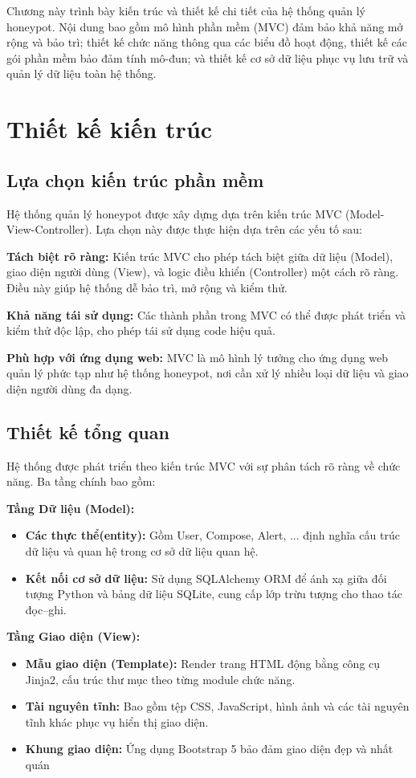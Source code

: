 \documentclass[../DoAn.tex]{subfiles}
\begin{document}
Chương này trình bày kiến trúc và thiết kế chi tiết của hệ thống quản lý honeypot. Nội dung bao gồm mô hình phần mềm (MVC) đảm bảo khả năng mở rộng và bảo trì; thiết kế chức năng thông qua các biểu đồ hoạt động, thiết kế các gói phần mềm bảo đảm tính mô-đun; và thiết kế cơ sở dữ liệu phục vụ lưu trữ và quản lý dữ liệu toàn hệ thống.

\section{Thiết kế kiến trúc}
\subsection{Lựa chọn kiến trúc phần mềm}
Hệ thống quản lý honeypot được xây dựng dựa trên kiến trúc MVC (Model-View-Controller). Lựa chọn này được thực hiện dựa trên các yếu tố sau:

\textbf{Tách biệt rõ ràng:} Kiến trúc MVC cho phép tách biệt giữa dữ liệu (Model), giao diện người dùng (View), và logic điều khiển (Controller) một cách rõ ràng. Điều này giúp hệ thống dễ bảo trì, mở rộng và kiểm thử.

\textbf{Khả năng tái sử dụng:} Các thành phần trong MVC có thể được phát triển và kiểm thử độc lập, cho phép tái sử dụng code hiệu quả.

\textbf{Phù hợp với ứng dụng web:} MVC là mô hình lý tưởng cho ứng dụng web quản lý phức tạp như hệ thống honeypot, nơi cần xử lý nhiều loại dữ liệu và giao diện người dùng đa dạng.


\subsection{Thiết kế tổng quan}
Hệ thống được phát triển theo kiến trúc MVC với sự phân tách rõ ràng về chức năng. Ba tầng chính bao gồm:

\textbf{Tầng Dữ liệu (Model):}
\begin{itemize}
    \item \textbf{Các thực thể(entity):} Gồm User, Compose, Alert, ... định nghĩa cấu trúc dữ liệu và quan hệ trong cơ sở dữ liệu quan hệ.
    \item \textbf{Kết nối cơ sở dữ liệu:} Sử dụng SQLAlchemy ORM để ánh xạ giữa đối tượng Python và bảng dữ liệu SQLite, cung cấp lớp trừu tượng cho thao tác đọc–ghi.
\end{itemize}

\textbf{Tầng Giao diện (View):}
\begin{itemize}
    \item \textbf{Mẫu giao diện (Template):} Render trang HTML động bằng công cụ Jinja2, cấu trúc thư mục theo từng module chức năng.
    \item \textbf{Tài nguyên tĩnh:} Bao gồm tệp CSS, JavaScript, hình ảnh và các tài nguyên tĩnh khác phục vụ hiển thị giao diện.
    \item \textbf{Khung giao diện:} Ứng dụng Bootstrap 5 bảo đảm giao diện đẹp và nhất quán 
\end{itemize}
\end{document}
